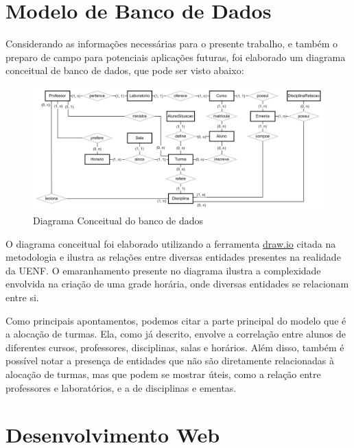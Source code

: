 \section{Modelo de Banco de Dados} %

    Considerando as informações necessárias para o presente trabalho, e também o preparo de campo para potenciais aplicações futuras, foi elaborado um diagrama conceitual de banco de dados, que pode ser visto abaixo:

    \begin{figure}[htbp]\centering
        \caption{\label{fig:DiagramConceitual} Diagrama Conceitual do banco de dados}
        \includegraphics[scale=0.8]{files/img/DiagramaConceitual/DiagramaConceitualBranco.png}
    \end{figure} %


    O diagrama conceitual foi elaborado utilizando a ferramenta \href{https://www.drawio.com/}{draw.io} citada na metodologia e ilustra as relações entre diversas entidades presentes na realidade da UENF. O emaranhamento presente no diagrama ilustra a complexidade envolvida na criação de uma grade horária, onde diversas entidades se relacionam entre si.

    Como principais apontamentos, podemos citar a parte principal do modelo que é a alocação de turmas. Ela, como já descrito, envolve a correlação entre alunos de diferentes cursos, professores, disciplinas, salas e horários. Além disso, também é possível notar a presença de entidades que não são diretamente relacionadas à alocação de turmas, mas que podem se mostrar úteis, como a relação entre professores e laboratórios, e a de disciplinas e ementas.

\section{Desenvolvimento Web} %

